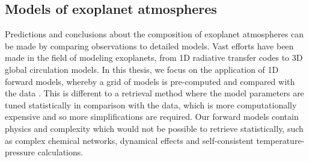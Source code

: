 

\subsection{Models of exoplanet atmospheres}%

Predictions and conclusions about the composition of exoplanet atmospheres can be made by comparing observations to detailed models. Vast efforts have been made in the field of modeling exoplanets, from 1D radiative transfer codes to 3D global circulation models. In this thesis, we focus on the application of 1D forward models, whereby a grid of models is pre-computed and compared with the data \citep{Zhang2019, Tsai2017, Piskorz2018, Line2013a}. This is different to a retrieval method where the model parameters are tuned statistically in comparison with the data, which is more computationally expensive and so more simplifications are required. Our forward models contain physics and complexity which would not be possible to retrieve statistically, such as complex chemical networks, dynamical effects and self-consistent temperature-pressure calculations.

